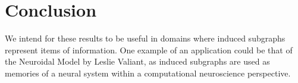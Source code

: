 \documentclass[10pt]{extarticle}
\newtheorem{theorem}{Theorem}
\theoremstyle{definition}
\begin{document}
\section{Conclusion}

We intend for these results to be useful in domains where induced subgraphs represent items of information. One example of an application could be that of the Neuroidal Model by Leslie Valiant, as induced subgraphs are used as memories of a neural system within a computational neuroscience perspective.


\end{document}
